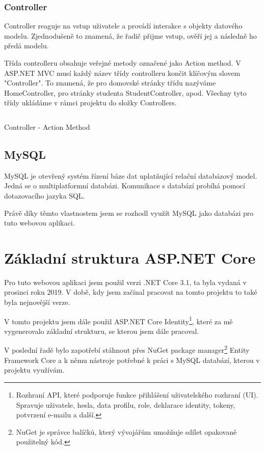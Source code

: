 \documentclass[a4paper, 12pt]{report}
\begin{document}
	\subsection{Controller} \label{Controller_teorie}
	Controller reaguje na vstup uživatele a provádí interakce s objekty datového modelu. Zjednodušeně to znamená, že řadič přijme vstup, ověří jej a následně ho předá modelu.\cite{MVC_Wiki_EN}\par
	Třída controlleru obsahuje veřejné metody označené jako Action method. V ASP.NET MVC musí každý název třídy controlleru končit klíčovým slovem "Controller". To znamená, že pro domovské stránky třídu nazýváme HomeController, pro stránky studenta StudentController, apod. Všechny tyto třídy ukládáme v rámci projektu do složky Controllers.
	\begin{listing}[H]
		\inputminted{csharp}{SourceCode/Controllers/ActionMethod.cs}
		\caption{Controller - Action Method}
		\label{ActionMethod}
	\end{listing}

	\section{MySQL}
	MySQL je otevřený systém řízení báze dat uplatňující relační databázový model. Jedná se o multiplatformní databázi. Komunikace s databází probíhá pomocí dotazovacího jazyka SQL.\cite{MySQL_Wiki_CZ}\par
	Právě díky těmto vlastnostem jsem se rozhodl využít MySQL jako databázi pro tuto webovou aplikaci.

	\chapter{Základní struktura ASP.NET Core}
	Pro tuto webovou aplikaci jsem použil verzi .NET Core 3.1, ta byla vydaná v prosinci roku 2019. V době, kdy jsem začínal pracovat na tomto projektu to také byla nejnovější verze.\par
	V tomto projektu jsem dále použil ASP.NET Core Identity\footnote{Rozhraní API, které podporuje funkce přihlášení uživatelského rozhraní (UI). Spravuje uživatele, hesla, data profilu, role, deklarace identity, tokeny, potvrzení e-mailu a další.\cite{ASP.NET_Core_Identity}}, které za mě vygenerovalo základní strukturu, se kterou jsem dále pracoval.\par
	V poslední řadě bylo zapotřebí stáhnout přes NuGet package manager\footnote{NuGet je správce balíčků, který vývojářům umožňuje sdílet opakovaně použitelný kód.} Entity Framework Core a k němu nástroje potřebné k práci s MySQL databází, kterou v projektu využívám.
\end{document}

